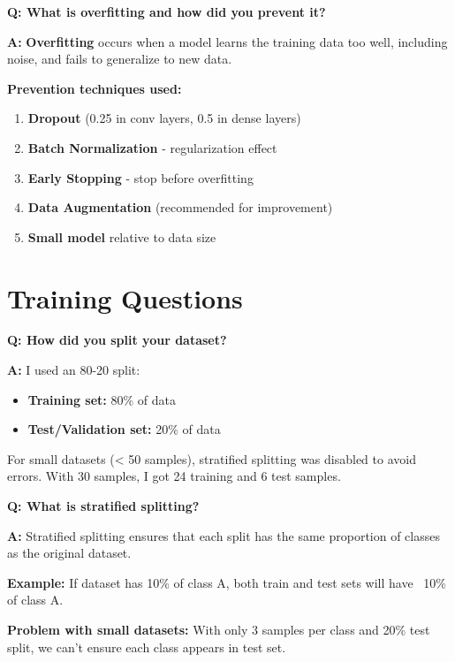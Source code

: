 \documentclass[a4paper,12pt]{article}
\newcommand{\vivaQ}[1]{\textcolor{questioncolor}{\textbf{Q: #1}}}
\newcommand{\vivaA}[1]{\textcolor{answercolor}{\textbf{A:}} #1}
\begin{document}
\vspace{0.5cm}

\vivaQ{What is overfitting and how did you prevent it?}

\vivaA{\textbf{Overfitting} occurs when a model learns the training data too well, including noise, and fails to generalize to new data.

\textbf{Prevention techniques used:}
\begin{enumerate}
    \item \textbf{Dropout} (0.25 in conv layers, 0.5 in dense layers)
    \item \textbf{Batch Normalization} - regularization effect
    \item \textbf{Early Stopping} - stop before overfitting
    \item \textbf{Data Augmentation} (recommended for improvement)
    \item \textbf{Small model} relative to data size
\end{enumerate}}

\section{Training Questions}

\vivaQ{How did you split your dataset?}

\vivaA{I used an 80-20 split:
\begin{itemize}
    \item \textbf{Training set:} 80\% of data
    \item \textbf{Test/Validation set:} 20\% of data
\end{itemize}

For small datasets (< 50 samples), stratified splitting was disabled to avoid errors. With 30 samples, I got 24 training and 6 test samples.}

\vspace{0.5cm}

\vivaQ{What is stratified splitting?}

\vivaA{Stratified splitting ensures that each split has the same proportion of classes as the original dataset.

\textbf{Example:} If dataset has 10\% of class A, both train and test sets will have ~10\% of class A.

\textbf{Problem with small datasets:} With only 3 samples per class and 20\% test split, we can't ensure each class appears in test set.}
\end{document}
